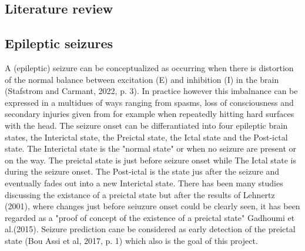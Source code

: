 


%

\subsection{Literature review}

\subsection{Epileptic seizures}
A (epileptic) seizure can be conceptualized as occurring when there is distortion of the normal balance between excitation (E) and
inhibition (I) in the brain (Stafstrom and Carmant, 2022, p. 3). In practice however this imbalnance can be expressed in a multidues of ways ranging from spasms, loss of consciousness and secondary injuries given from for example when repeatedly hitting hard surfaces with the head.
The seizure onset can be differantiated into four epileptic brain states, the Interictal state, the Preictal state, the Ictal state and the Post-ictal state.
The Interictal state is the "normal state" or when no seizure are present or on the way. The preictal state is just before seizure onset while The Ictal state is during the seizure onset. The Post-ictal is the state jus after the seizure and eventually fades out into a new Interictal state. 
There has been many studies discussing the existance of a preictal state but after the results of Lehnertz (2001), where changes just before seiuzure onset could be clearly seen, it has been regarded as a "proof of concept of the existence of a preictal state" Gadhoumi et al.(2015).
Seizure prediction cane be considered as early detection of the preictal state (Bou Assi et al, 2017, p. 1) which also is the goal of this project.


